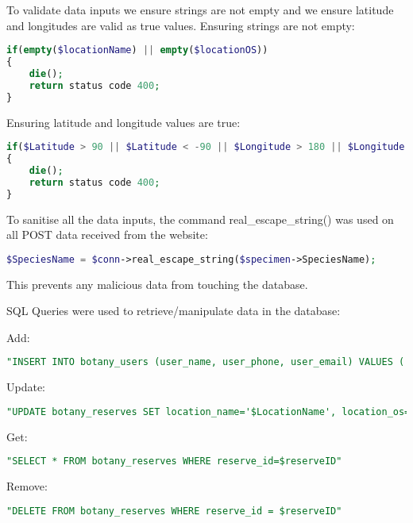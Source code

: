         To validate data inputs we ensure strings are not empty and we ensure latitude and longitudes are valid as true values. Ensuring strings are not empty: 
        
        \begin{lstlisting}[language=php]
if(empty($locationName) || empty($locationOS))
{
    die();
    return status code 400;
}
        \end{lstlisting}

        Ensuring latitude and longitude values are true:
    
        \begin{lstlisting}[language=php]
if($Latitude > 90 || $Latitude < -90 || $Longitude > 180 || $Longitude < -180)
{
    die();
    return status code 400;
}
        \end{lstlisting}

        To sanitise all the data inputs, the command real\_escape\_string() was used on all POST data received from the website: 
        
        \begin{lstlisting}[language=php]
$SpeciesName = $conn->real_escape_string($specimen->SpeciesName);
        \end{lstlisting}
        
        This prevents any malicious data from touching the database.

        SQL Queries were used to retrieve/manipulate data in the database:

        Add:
        \begin{lstlisting}[language=sql]
"INSERT INTO botany_users (user_name, user_phone, user_email) VALUES ('$UserName', '$UserPhone', '$UserEmail')"
        \end{lstlisting}

        Update:
        \begin{lstlisting}[language=sql]
"UPDATE botany_reserves SET location_name='$LocationName', location_os='$LocationOS', description='$Description' WHERE reserve_id = $ReserveID"
        \end{lstlisting}
            
        Get:
        \begin{lstlisting}[language=sql]
"SELECT * FROM botany_reserves WHERE reserve_id=$reserveID"
        \end{lstlisting}
        
        Remove:
        \begin{lstlisting}[language=sql]
"DELETE FROM botany_reserves WHERE reserve_id = $reserveID"
        \end{lstlisting}

